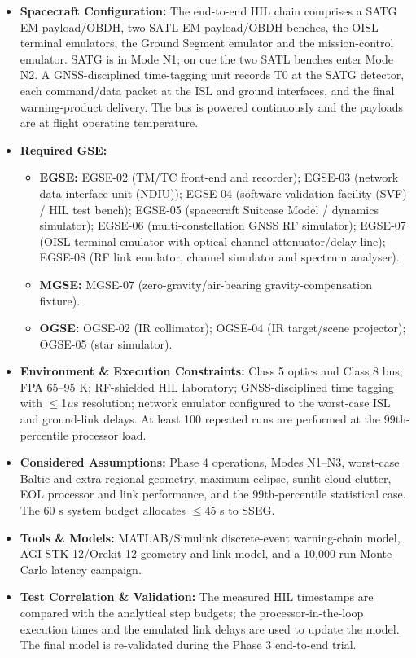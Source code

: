 \begin{itemize}
\item \textbf{Spacecraft Configuration:} The end-to-end HIL chain comprises a SATG EM payload/OBDH, two SATL EM payload/OBDH benches, the OISL terminal emulators, the Ground Segment emulator and the mission-control emulator. SATG is in Mode N1; on cue the two SATL benches enter Mode N2. A GNSS-disciplined time-tagging unit records T0 at the SATG detector, each command/data packet at the ISL and ground interfaces, and the final warning-product delivery. The bus is powered continuously and the payloads are at flight operating temperature.
\item \textbf{Required GSE:}
\begin{itemize}
\item \textbf{EGSE:} EGSE-02 (TM/TC front-end and recorder); EGSE-03 (network data interface unit (NDIU)); EGSE-04 (software validation facility (SVF) / HIL test bench); EGSE-05 (spacecraft Suitcase Model / dynamics simulator); EGSE-06 (multi-constellation GNSS RF simulator); EGSE-07 (OISL terminal emulator with optical channel attenuator/delay line); EGSE-08 (RF link emulator, channel simulator and spectrum analyser).
\item \textbf{MGSE:} MGSE-07 (zero-gravity/air-bearing gravity-compensation fixture).
\item \textbf{OGSE:} OGSE-02 (IR collimator); OGSE-04 (IR target/scene projector); OGSE-05 (star simulator).
\end{itemize}
\item \textbf{Environment \& Execution Constraints:} Class 5 optics and Class 8 bus; FPA 65--95 K; RF-shielded HIL laboratory; GNSS-disciplined time tagging with $\le$1$\mu$s resolution; network emulator configured to the worst-case ISL and ground-link delays. At least 100 repeated runs are performed at the 99th-percentile processor load.
\item \textbf{Considered Assumptions:} Phase 4 operations, Modes N1--N3, worst-case Baltic and extra-regional geometry, maximum eclipse, sunlit cloud clutter, EOL processor and link performance, and the 99th-percentile statistical case. The 60 s system budget allocates $\le$45 s to SSEG.
\item \textbf{Tools \& Models:} MATLAB/Simulink discrete-event warning-chain model, AGI STK 12/Orekit 12 geometry and link model, and a 10,000-run Monte Carlo latency campaign.
\item \textbf{Test Correlation \& Validation:} The measured HIL timestamps are compared with the analytical step budgets; the processor-in-the-loop execution times and the emulated link delays are used to update the model. The final model is re-validated during the Phase 3 end-to-end trial.
\end{itemize}
